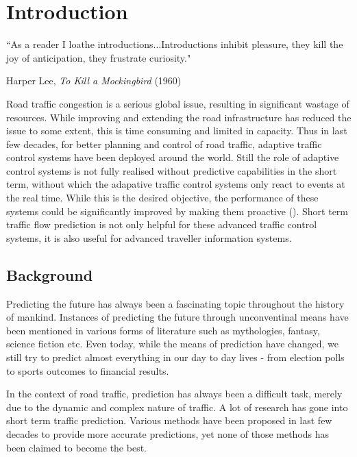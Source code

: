 

\chapter{Introduction} %

\label{Chapter1} %


{``As a reader I loathe introductions...Introductions inhibit pleasure, they kill the joy of
anticipation, they frustrate curiosity."}
\begin{flushright}
Harper Lee, \textit{To Kill a Mockingbird} (1960)
\end{flushright}

Road traffic congestion is a serious global issue, resulting in significant wastage of resources.
While improving and extending the road infrastructure has reduced the issue to some extent, this is
time consuming and limited in capacity. Thus in last few decades, for better planning and control
of road traffic, adaptive traffic control systems have been deployed around the world. Still the
role of adaptive control systems is not fully realised without predictive capabilities in the
short term, without which the adapative traffic control systems only react to events at the real
time. While this is the desired objective, the performance of these systems could be significantly
improved by making them proactive (\citet{smith1997traffic}). Short term traffic flow prediction
is not only helpful for these advanced traffic control systems, it is also useful for advanced
traveller information systems.

\section{Background}
Predicting the future has always been a fascinating topic throughout the history of mankind.
Instances of predicting the future through unconventinal means have been mentioned in various
forms of literature such as mythologies, fantasy, science fiction etc. Even today, while the
means of prediction have changed, we still try to predict almost everything in our day to day
lives - from election polls to sports outcomes to financial results.

In the context of road traffic, prediction has always been a difficult task, merely due to the
dynamic and complex nature of traffic. A lot of research has gone into short term
traffic prediction. Various methods have been proposed in last few decades to provide more
accurate predictions, yet none of those methods has been claimed to become the best.

